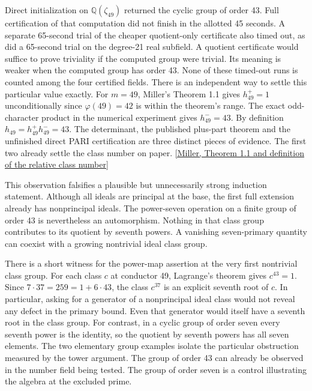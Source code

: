 \documentclass[12pt,letterpaper]{article}
\begin{document}
Direct initialization on \(\mathbb Q(\zeta_{49})\) returned the cyclic group of order 43. Full certification of that computation did not finish in the allotted 45 seconds. A separate 65-second trial of the cheaper quotient-only certificate also timed out, as did a 65-second trial on the degree-21 real subfield. A quotient certificate would suffice to prove triviality if the computed group were trivial. Its meaning is weaker when the computed group has order 43. None of these timed-out runs is counted among the four certified fields. There is an independent way to settle this particular value exactly. For \(m=49\), Miller's Theorem 1.1 gives \(h^+_{49}=1\) unconditionally since \(\varphi(49)=42\) is within the theorem's range. The exact odd-character product in the numerical experiment gives \(h^-_{49}=43\). By definition \(h_{49}=h^+_{49}h^-_{49}=43\). The determinant, the published plus-part theorem and the unfinished direct PARI certification are three distinct pieces of evidence. The first two already settle the class number on paper. \href{https://doi.org/10.1112/S1461157014000382}{[Miller, Theorem 1.1 and definition of the relative class number]}

This observation falsifies a plausible but unnecessarily strong induction statement. Although all ideals are principal at the base, the first full extension already has nonprincipal ideals. The power-seven operation on a finite group of order 43 is nevertheless an automorphism. Nothing in that class group contributes to its quotient by seventh powers. A vanishing seven-primary quantity can coexist with a growing nontrivial ideal class group.


There is a short witness for the power-map assertion at the very first nontrivial class group. For each class \(c\) at conductor 49, Lagrange's theorem gives \(c^{43}=1\). Since \(7\cdot37=259=1+6\cdot43\), the class \(c^{37}\) is an explicit seventh root of \(c\). In particular, asking for a generator of a nonprincipal ideal class would not reveal any defect in the primary bound. Even that generator would itself have a seventh root in the class group. For contrast, in a cyclic group of order seven every seventh power is the identity, so the quotient by seventh powers has all seven elements. The two elementary group examples isolate the particular obstruction measured by the tower argument. The group of order 43 can already be observed in the number field being tested. The group of order seven is a control illustrating the algebra at the excluded prime.
\end{document}
